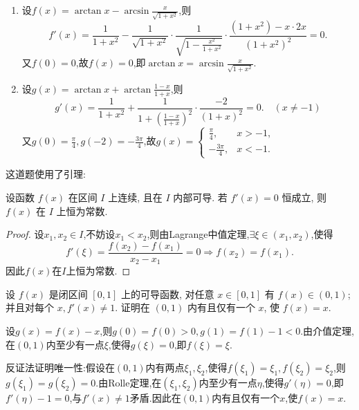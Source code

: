 \begin{solution}
    \begin{enumerate}
        \item 设$f(x) = \arctan x - \arcsin\frac{x}{\sqrt{1+x^2}}$,则
              $$
                  f'(x) = \frac{1}{1+x^2} - \frac{1}{\sqrt{1+x^2}} \cdot \frac{1}{\sqrt{1-\frac{x^2}{1+x^2}}} \cdot \frac{(1+x^2) - x \cdot 2x}{(1+x^2)^2} = 0.
              $$
              又$f(0) = 0$,故$f(x) = 0$,即$\arctan x = \arcsin\frac{x}{\sqrt{1+x^2}}$.
        \item 设$g(x) = \arctan x + \arctan\frac{1-x}{1+x}$,则
              $$
                  g'(x) = \frac{1}{1+x^2} + \frac{1}{1+\left(\frac{1-x}{1+x}\right)^2} \cdot \frac{-2}{(1+x)^2} = 0. \quad (x \ne -1)
                $$
                又$g(0) = \frac{\pi}{4},g(-2) = -\frac{3\pi}{4}$,故$g(x) = \begin{cases} \frac{\pi}{4}, & x > -1, \\ -\frac{3\pi}{4}, & x < -1. \end{cases}$
    \end{enumerate}
\end{solution}

这道题使用了引理:
\begin{lemma*}
    设函数 $f(x)$ 在区间 $I$ 上连续, 且在 $I$ 内部可导. 若 $f'(x)=0$ 恒成立, 则 $f(x)$ 在 $I$ 上恒为常数.
\end{lemma*}

\begin{proof}
    设$x_1,x_2 \in I$,不妨设$x_1 < x_2$,则由Lagrange中值定理,$\exists \xi \in (x_1,x_2)$,使得
    $$
        f'(\xi) = \frac{f(x_2)-f(x_1)}{x_2-x_1} = 0 \Rightarrow f(x_2) = f(x_1).
    $$
    因此$f(x)$在$I$上恒为常数.
\end{proof}

\begin{exercise}[3.3.6]
    设 $f(x)$ 是闭区间 $[0,1]$ 上的可导函数, 对任意 $x \in [0,1]$ 有 $f(x) \in (0,1)$; 并且对每个 $x, f'(x) \ne 1$. 证明在 $(0,1)$ 内有且仅有一个 $x$, 使 $f(x)=x$.
\end{exercise}

\begin{solution}
    设$g(x) = f(x) - x$,则$g(0) = f(0) > 0, g(1) = f(1) - 1 < 0$.由介值定理,在$(0,1)$内至少有一点$\xi$,使得$g(\xi) = 0$,即$f(\xi) = \xi$.
    
    反证法证明唯一性:假设在$(0,1)$内有两点$\xi_1,\xi_2$,使得$f(\xi_1) = \xi_1,f(\xi_2) = \xi_2$,则$g(\xi_1) = g(\xi_2) = 0$.由Rolle定理,在$(\xi_1,\xi_2)$内至少有一点$\eta$,使得$g'(\eta) = 0$,即$f'(\eta) - 1 = 0$,与$f'(x) \ne 1$矛盾.因此在$(0,1)$内有且仅有一个$x$,使$f(x) = x$.
\end{solution}


